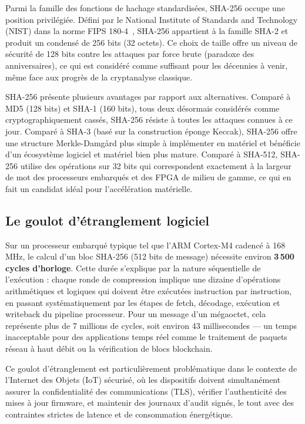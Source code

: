 Parmi la famille des fonctions de hachage standardisées, SHA-256 occupe une position privilégiée. Défini par le National Institute of Standards and Technology (NIST) dans la norme FIPS 180-4~\cite{fips180}, SHA-256 appartient à la famille SHA-2 et produit un condensé de 256 bits (32 octets). Ce choix de taille offre un niveau de sécurité de 128 bits contre les attaques par force brute (paradoxe des anniversaires), ce qui est considéré comme suffisant pour les décennies à venir, même face aux progrès de la cryptanalyse classique.

SHA-256 présente plusieurs avantages par rapport aux alternatives. Comparé à MD5 (128 bits) et SHA-1 (160 bits), tous deux désormais considérés comme cryptographiquement cassés, SHA-256 résiste à toutes les attaques connues à ce jour. Comparé à SHA-3 (basé sur la construction éponge Keccak), SHA-256 offre une structure Merkle-Damgård plus simple à implémenter en matériel et bénéficie d'un écosystème logiciel et matériel bien plus mature. Comparé à SHA-512, SHA-256 utilise des opérations sur 32 bits qui correspondent exactement à la largeur de mot des processeurs embarqués et des FPGA de milieu de gamme, ce qui en fait un candidat idéal pour l'accélération matérielle.

\subsection{Le goulot d'étranglement logiciel}

Sur un processeur embarqué typique tel que l'ARM Cortex-M4 cadencé à 168 MHz, le calcul d'un bloc SHA-256 (512 bits de message) nécessite environ \textbf{3\,500 cycles d'horloge}. Cette durée s'explique par la nature séquentielle de l'exécution : chaque ronde de compression implique une dizaine d'opérations arithmétiques et logiques qui doivent être exécutées instruction par instruction, en passant systématiquement par les étapes de fetch, décodage, exécution et writeback du pipeline processeur. Pour un message d'un mégaoctet, cela représente plus de 7 millions de cycles, soit environ 43 millisecondes --- un temps inacceptable pour des applications temps réel comme le traitement de paquets réseau à haut débit ou la vérification de blocs blockchain.

Ce goulot d'étranglement est particulièrement problématique dans le contexte de l'Internet des Objets (IoT) sécurisé, où les dispositifs doivent simultanément assurer la confidentialité des communications (TLS), vérifier l'authenticité des mises à jour firmware, et maintenir des journaux d'audit signés, le tout avec des contraintes strictes de latence et de consommation énergétique.

